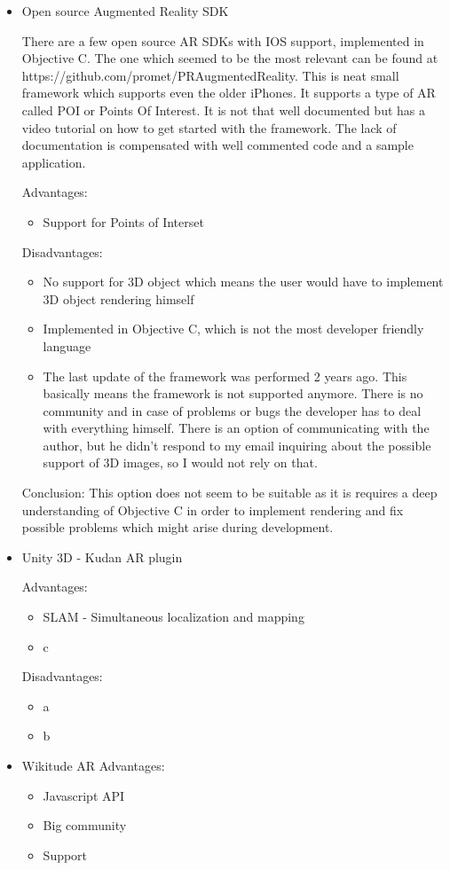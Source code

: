 \documentclass[thesis=M,english]{FITthesis}[2012/10/20]
\begin{document}
\begin{itemize}
	\item{Open source Augmented Reality SDK}
	
	There are a few open source AR SDKs with IOS support, implemented in Objective C. The one which seemed to be the most relevant can be found at  https://github.com/promet/PRAugmentedReality. This is neat small framework which supports even the older iPhones. It supports a type of AR called POI or Points Of Interest. It is not that well documented but has a video tutorial on how to get started with the framework. The lack of documentation is compensated with well commented code and a sample application.
	
	Advantages:
	\begin{itemize}
		\item{Support for Points of Interset}
	\end{itemize}
	
	Disadvantages:
	\begin{itemize}
		\item{No support for 3D object which means the user would have to implement 3D object rendering himself}
		\item{Implemented in Objective C, which is not the most developer friendly language}
		\item{The last update of the framework was performed 2 years ago. This basically means the framework is not supported anymore. There is no community and in case of problems or bugs the developer has to deal with everything himself. There is an option of communicating with the author, but he didn't respond to my email inquiring about the possible support of 3D images, so I would not rely on that.}
	\end{itemize}

	Conclusion:
	This option does not seem to be suitable as it is requires a deep understanding of Objective C in order to implement rendering and fix possible problems which might arise during development.

	\item{Unity 3D - Kudan AR plugin}
	
	Advantages:
	\begin{itemize}
		\item{SLAM} - Simultaneous localization and mapping
		\item{c}
		
	\end{itemize}
	
	Disadvantages:
	\begin{itemize}
		\item{a}
		\item{b}
	\end{itemize}	
	\item{Wikitude AR}
	Advantages:
	\begin{itemize}
		\item{Javascript API}
		\item{Big community}
		\item{Support}				
	\end{itemize}
	

\end{itemize}
\end{document}
